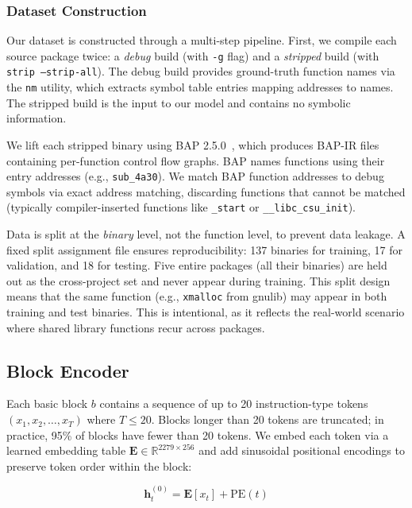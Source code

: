 \documentclass[sigconf,nonacm]{acmart}
\begin{document}
\subsubsection{Dataset Construction}
\label{sec:dataset_construction}

Our dataset is constructed through a multi-step pipeline. First, we compile each source package twice: a \emph{debug} build (with \texttt{-g} flag) and a \emph{stripped} build (with \texttt{strip --strip-all}). The debug build provides ground-truth function names via the \texttt{nm} utility, which extracts symbol table entries mapping addresses to names. The stripped build is the input to our model and contains no symbolic information.

We lift each stripped binary using BAP 2.5.0~\cite{bap}, which produces BAP-IR files containing per-function control flow graphs. BAP names functions using their entry addresses (e.g., \texttt{sub\_4a30}). We match BAP function addresses to debug symbols via exact address matching, discarding functions that cannot be matched (typically compiler-inserted functions like \texttt{\_start} or \texttt{\_\_libc\_csu\_init}).

Data is split at the \emph{binary} level, not the function level, to prevent data leakage. A fixed split assignment file ensures reproducibility: 137 binaries for training, 17 for validation, and 18 for testing. Five entire packages (all their binaries) are held out as the cross-project set and never appear during training. This split design means that the same function (e.g., \texttt{xmalloc} from gnulib) may appear in both training and test binaries. This is intentional, as it reflects the real-world scenario where shared library functions recur across packages.

\subsection{Block Encoder}
\label{sec:block_encoder}

Each basic block $b$ contains a sequence of up to 20 instruction-type tokens $(x_1, x_2, \ldots, x_T)$ where $T \leq 20$. Blocks longer than 20 tokens are truncated; in practice, 95\% of blocks have fewer than 20 tokens. We embed each token via a learned embedding table $\mathbf{E} \in \mathbb{R}^{2279 \times 256}$ and add sinusoidal positional encodings to preserve token order within the block:

\begin{equation}
    \mathbf{h}_t^{(0)} = \mathbf{E}[x_t] + \text{PE}(t)
\end{equation}
\end{document}
